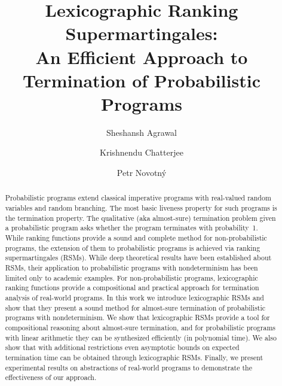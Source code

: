 \documentclass[acmsmall, anonymous, review, nocopyrightspace]{acmart}
\begin{document}

\title{Lexicographic Ranking Supermartingales:\\ An Efficient Approach to 
Termination of Probabilistic Programs}

\author{Sheshansh Agrawal}

\author{Krishnendu Chatterjee}

\author{Petr Novotn\'{y}}

\begin{abstract}
Probabilistic programs extend classical imperative programs with 
real-valued random variables and random branching.
The most basic liveness property for such programs is the termination 
property.
The qualitative (aka almost-sure) termination problem given a probabilistic program
asks whether the program terminates with probability~1.
While ranking functions provide a sound and complete method for 
non-probabilistic
programs, the extension of them to probabilistic programs is achieved
via ranking supermartingales (RSMs). 
While deep theoretical results have been established about RSMs, 
their application to probabilistic programs with nondeterminism has been limited
only to academic examples. 
For non-probabilistic programs, lexicographic ranking functions provide a 
compositional
and practical approach for termination analysis of real-world programs. 
In this work we introduce lexicographic RSMs and show that they present a sound
method for almost-sure termination of probabilistic programs with nondeterminism.
We show that lexicographic RSMs provide a tool for compositional reasoning 
about almost-sure termination,
and for probabilistic programs with linear arithmetic they can be synthesized 
efficiently (in polynomial time).
We also show that with additional restrictions even asymptotic bounds on expected
termination time can be obtained through lexicographic RSMs.
Finally, we present experimental results on abstractions of real-world programs
to demonstrate the effectiveness of our approach.
\end{abstract}



\maketitle
\end{document}
